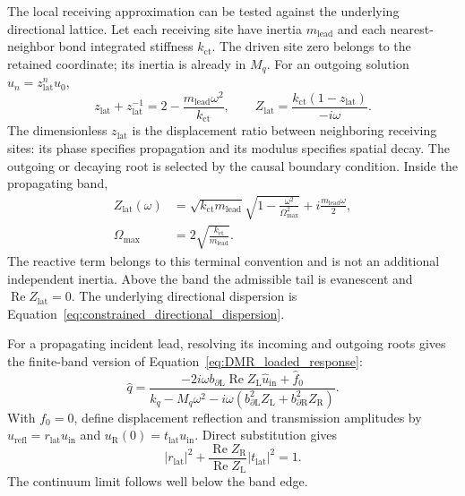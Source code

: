 The local receiving approximation can be tested against the underlying directional lattice. Let each receiving site have inertia $m_{\mathrm{lead}}$ and each nearest-neighbor bond integrated stiffness $k_{\mathrm{ct}}$. The driven site zero belongs to the retained coordinate; its inertia is already in $M_q$. For an outgoing solution $u_n=z_{\mathrm{lat}}^nu_0$,
\begin{equation}
 z_{\mathrm{lat}}+z_{\mathrm{lat}}^{-1}
 =2-\frac{m_{\mathrm{lead}}\omega^2}{k_{\mathrm{ct}}},
 \qquad
 Z_{\mathrm{lat}}=\frac{k_{\mathrm{ct}}(1-z_{\mathrm{lat}})}{-i\omega}.
\label{eq:DMR_discrete_root}
\end{equation}
The dimensionless $z_{\mathrm{lat}}$ is the displacement ratio between neighboring receiving sites: its phase specifies propagation and its modulus specifies spatial decay. The outgoing or decaying root is selected by the causal boundary condition. Inside the propagating band,
\begin{equation}
\begin{aligned}
 Z_{\mathrm{lat}}(\omega)
 &=\sqrt{k_{\mathrm{ct}}m_{\mathrm{lead}}}
 \sqrt{1-\frac{\omega^2}{\Omega_{\max}^2}}
 +i\frac{m_{\mathrm{lead}}\omega}{2},\\
 \Omega_{\max}&=2\sqrt{\frac{k_{\mathrm{ct}}}{m_{\mathrm{lead}}}}.
\end{aligned}
\label{eq:DMR_discrete_impedance}
\end{equation}
The reactive term belongs to this terminal convention and is not an additional independent inertia. Above the band the admissible tail is evanescent and $\operatorname{Re}Z_{\mathrm{lat}}=0$. The underlying directional dispersion is Equation~\eqref{eq:constrained_directional_dispersion}.

For a propagating incident lead, resolving its incoming and outgoing roots gives the finite-band version of Equation~\eqref{eq:DMR_loaded_response}:
\begin{equation}
 \widehat q=
 \frac{-2i\omega b_{\partial\mathrm L}\operatorname{Re}Z_{\mathrm L}
 \widehat u_{\mathrm{in}}+\widehat f_0}
 {k_q-M_q\omega^2-i\omega
 (b_{\partial\mathrm L}^2Z_{\mathrm L}+b_{\partial\mathrm R}^2Z_{\mathrm R})}.
\label{eq:DMR_discrete_boundary_response}
\end{equation}
With $f_0=0$, define displacement reflection and transmission amplitudes by $u_{\mathrm{refl}}=r_{\mathrm{lat}}u_{\mathrm{in}}$ and $u_{\mathrm R}(0)=t_{\mathrm{lat}}u_{\mathrm{in}}$. Direct substitution gives
\begin{equation}
 |r_{\mathrm{lat}}|^2+
 \frac{\operatorname{Re}Z_{\mathrm R}}{\operatorname{Re}Z_{\mathrm L}}
 |t_{\mathrm{lat}}|^2=1.
\label{eq:DMR_discrete_flux}
\end{equation}
The continuum limit follows well below the band edge.

